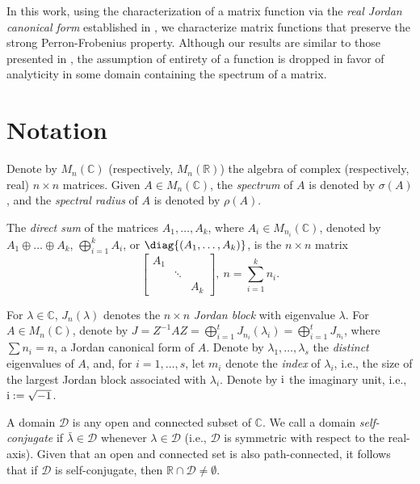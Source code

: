 \documentclass[10pt,twoside,leqno]{siamltex}
\begin{document}
In this work, using the characterization of a matrix function via the \textit{real Jordan canonical form} established in \cite{mpt2014}, we characterize matrix functions that preserve the strong Perron-Frobenius property. Although our results are similar to those presented in \cite{es2010}, the assumption of entirety of a function is dropped in favor of analyticity in some domain containing the spectrum of a matrix.

\section{Notation}

Denote by ${M_{{n}}({{\mathbb{{C}}}})}$ (respectively, ${M_{{n}}({{\mathbb{{R}}}})}$) the algebra of complex (respectively, real) $n \times n$ matrices. Given $A \in {M_{{n}}({{\mathbb{{C}}}})}$, the \textit{spectrum} of $A$ is denoted by ${\sigma \left( {A} \right)}$, and the \textit{spectral radius} of $A$ is denoted by ${\rho\left({A}\right)}$. 

 The \textit{direct sum} of the matrices $A_1, \dots, A_k$, where $A_i \in {M_{{n_i}}({{\mathbb{{C}}}})}$, denoted by $A_1 \oplus \dots \oplus A_k$, $\bigoplus_{i=1}^k A_i$, or $\diag{(A_1,\dots,A_k)}$, is the $n \times n$ matrix 
\[ \begin{bmatrix} A_1 \\ & \ddots \\ & & A_k \end{bmatrix},~n = \sum_{i=1}^k n_i. \]

For $\lambda \in {\mathbb{{C}}}$, ${J_{{n}}{\left( {\lambda} \right)}}$ denotes the $n \times n$ \textit{Jordan block} with eigenvalue $\lambda$. For $A \in {M_{{n}}({{\mathbb{{C}}}})}$, denote by $J = {{Z}^{-1}} A Z = \bigoplus_{i=1}^t {J_{{n_i}}{\left( {\lambda_i} \right)}} = \bigoplus_{i=1}^t J_{n_i}$, where $\sum n_i = n$, a Jordan canonical form of $A$. Denote by $\lambda_1,\dots,\lambda_s$ the \textit{distinct} eigenvalues of $A$, and, for $i=1,\dots,s$, let $m_i$ denote the \textit{index} of $\lambda_i$, i.e., the size of the largest Jordan block associated with $\lambda_i$. Denote by ${\textup{i}}$ the imaginary unit, i.e., ${\textup{i}} := \sqrt{-1}$.
 
A domain $\mathcal{D}$ is any open and connected subset of ${\mathbb{{C}}}$. We call a domain \textit{self-conjugate} if $\bar{\lambda} \in \mathcal{D}$ whenever $\lambda \in \mathcal{D}$ (i.e., $\mathcal{D}$ is symmetric with respect to the real-axis). Given that an open and connected set is also path-connected, it follows that if $\mathcal{D}$ is self-conjugate, then ${\mathbb{{R}}} \cap \mathcal{D} \neq \emptyset$.  
\end{document}
